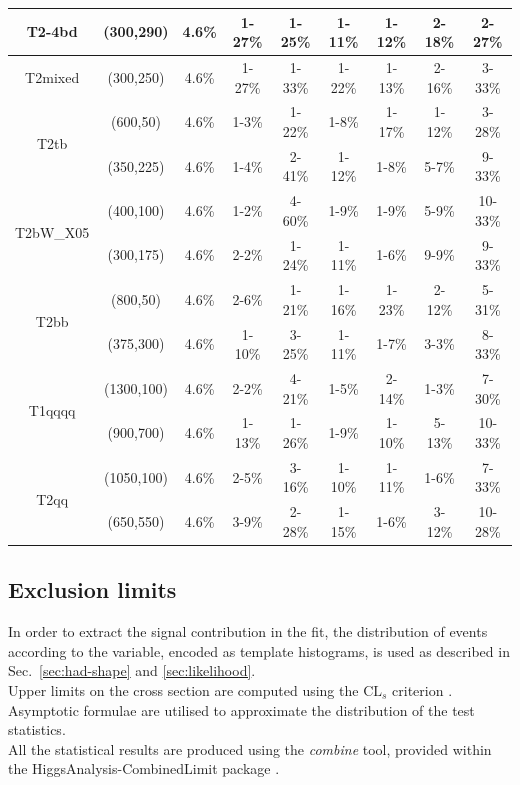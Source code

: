\begin{table}[h!]
\begin{tabular}{ ccccccccc }
\multirow{1}{*}{T2-4bd}
 & (300,290) & 4.6\% & 1-27\% & 1-25\% & 1-11\% & 1-12\% & 2-18\% & 2-27\% \\ \hline 
\multirow{1}{*}{T2mixed}
 & (300,250) & 4.6\% & 1-27\% & 1-33\% & 1-22\% & 1-13\% & 2-16\% & 3-33\% \\ \hline 
\multirow{2}{*}{T2tb}
 & (600,50) & 4.6\% & 1-3\% & 1-22\% & 1-8\% & 1-17\% & 1-12\% & 3-28\% \\ 
 & (350,225) & 4.6\% & 1-4\% & 2-41\% & 1-12\% & 1-8\% & 5-7\% & 9-33\% \\ \hline 
\multirow{2}{*}{T2bW\_X05}
 & (400,100) & 4.6\% & 1-2\% & 4-60\% & 1-9\% & 1-9\% & 5-9\% & 10-33\% \\ 
 & (300,175) & 4.6\% & 2-2\% & 1-24\% & 1-11\% & 1-6\% & 9-9\% & 9-33\% \\ \hline 
\multirow{2}{*}{T2bb}
 & (800,50) & 4.6\% & 2-6\% & 1-21\% & 1-16\% & 1-23\% & 2-12\% & 5-31\% \\ 
 & (375,300) & 4.6\% & 1-10\% & 3-25\% & 1-11\% & 1-7\% & 3-3\% & 8-33\% \\ \hline 
\multirow{2}{*}{T1qqqq}
 & (1300,100) & 4.6\% & 2-2\% & 4-21\% & 1-5\% & 2-14\% & 1-3\% & 7-30\% \\ 
 & (900,700) & 4.6\% & 1-13\% & 1-26\% & 1-9\% & 1-10\% & 5-13\% & 10-33\% \\ \hline 
\multirow{2}{*}{T2qq}
 & (1050,100) & 4.6\% & 2-5\% & 3-16\% & 1-10\% & 1-11\% & 1-6\% & 7-33\% \\ 
 & (650,550) & 4.6\% & 3-9\% & 2-28\% & 1-15\% & 1-6\% & 3-12\% & 10-28\% \\ \hline 
    \hline
  \end{tabular}
\end{table}




\subsection{Exclusion limits}
\label{sec:susy_results}

In order to extract the signal contribution in the fit, the distribution of events according to the \mht variable, 
encoded as template histograms, is used as described in Sec.~\ref{sec:had-shape} and \ref{sec:likelihood}. \\
Upper limits on the cross section are computed using the $\text{CL}_{s}$ criterion \cite{CLsTechnique}. 
Asymptotic formulae \cite{AsymptoticFormulae} are utilised to approximate the distribution of the test statistics. \\
All the statistical results are produced using the \textit{combine} tool, 
provided within the HiggsAnalysis-CombinedLimit package \cite{Combine}. 

